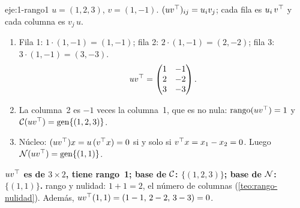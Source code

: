 \begin{solucion}{eje:1-rango1}
\datos $u=(1,2,3)$, $v=(1,-1)$.
\planteamiento $(uv^{\top})_{ij}=u_iv_j$; cada fila es $u_i\,v^{\top}$ y cada columna es $v_j\,u$.
\pasos
\begin{enumerate}[label=\arabic*.]
  \item Fila 1: $1\cdot(1,-1)=(1,-1)$; fila 2: $2\cdot(1,-1)=(2,-2)$; fila 3: $3\cdot(1,-1)=(3,-3)$.
  \[
  uv^{\top}=\begin{pmatrix}1&-1\\2&-2\\3&-3\end{pmatrix}.
  \]
  \item La columna~2 es $-1$ veces la columna~1, que es no nula: $\operatorname{rango}(uv^{\top})=1$ y $\mathcal{C}(uv^{\top})=\operatorname{gen}\{(1,2,3)\}$.
  \item Núcleo: $(uv^{\top})x=u\,(v^{\top} x)=0$ si y solo si $v^{\top} x=x_1-x_2=0$. Luego $\mathcal{N}(uv^{\top})=\operatorname{gen}\{(1,1)\}$.
\end{enumerate}
\resultado \textbf{$uv^{\top}$ es de $3\times 2$, tiene rango~1; base de $\mathcal{C}$: $\{(1,2,3)\}$; base de $\mathcal{N}$: $\{(1,1)\}$.}
\comprobacion rango y nulidad: $1+1=2$, el número de columnas (\cref{teo:rango-nulidad}). Además, $uv^{\top}(1,1)=(1-1,\,2-2,\,3-3)=0$.
\end{solucion}

